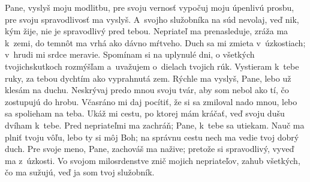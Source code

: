 Pane, vyslyš moju modlitbu,
pre svoju vernosť vypočuj moju úpenlivú prosbu,
pre svoju spravodlivosť ma vyslyš.
\versseparator
A~svojho služobníka na súd nevolaj,
veď nik, kým žije, nie je spravodlivý pred tebou.
\versseparator
Nepriateľ ma prenasleduje,
zráža ma k~zemi,
\versseparator
do temnôt ma vrhá ako dávno mŕtveho.
Duch sa mi zmieta v~úzkostiach;
v~hrudi mi srdce meravie.
\versseparator
Spomínam si na uplynulé dni,
o všetkých tvojichskutkoch rozmýšľam
a~uvažujem o~dielach tvojich rúk.
\versseparator
Vystieram k~tebe ruky,
za tebou dychtím ako vyprahnutá zem.
\versseparator
Rýchle ma vyslyš, Pane,
lebo už klesám na duchu.
\versseparator
Neskrývaj predo mnou svoju tvár,
aby som nebol ako tí, čo zostupujú do hrobu.
\versseparator
Včasráno mi daj pocítiť, že si sa zmiloval nado mnou,
lebo sa spolieham na teba.
\versseparator
Ukáž mi cestu, po ktorej mám kráčať,
veď svoju dušu dvíham k~tebe.
\versseparator
Pred nepriateľmi ma zachráň;
Pane, k~tebe sa utiekam.
Nauč ma plniť tvoju vôľu,
lebo ty si môj Boh;
\versseparator
na správnu cestu nech ma vedie tvoj dobrý duch.
Pre svoje meno, Pane, zachováš ma nažive;
\versseparator
pretože si spravodlivý, vyveď ma z~úzkosti.
Vo svojom milosrdenstve znič mojich nepriateľov,
\versseparator
zahub všetkých, čo ma sužujú,
veď ja som tvoj služobník.